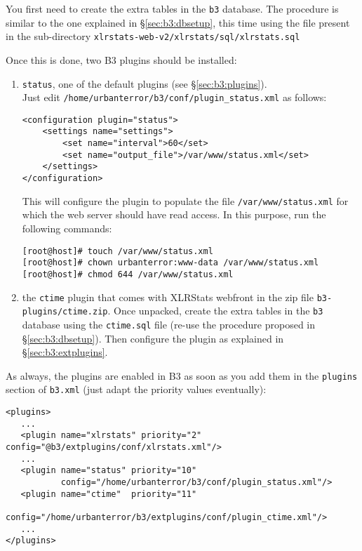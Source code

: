 \noindent 
You first need to create the extra tables in the \texttt{b3} database. 
The procedure is similar to the one explained in \S\ref{sec:b3:dbsetup}, this
time using the file present in the sub-directory 
\texttt{xlrstats-web-v2/xlrstats/sql/xlrstats.sql}

\noindent 
Once this is done, two B3 plugins should be installed: 
\begin{enumerate}
\item \texttt{status}, one of the default plugins (see \S\ref{sec:b3:plugins}). \\
  Just edit \texttt{/home/urbanterror/b3/conf/plugin\_status.xml} as follows:
  \begin{lstlisting}[style=apachecfg]    
<configuration plugin="status">
	<settings name="settings">
		<set name="interval">60</set>
		<set name="output_file">/var/www/status.xml</set>
	</settings>
</configuration>
  \end{lstlisting}
  This will configure the plugin to populate the file
  \texttt{/var/www/status.xml} for which the web server should have read
  access. In this purpose, run the following commands: 
  \begin{lstlisting}[style=command]
[root@host]# touch /var/www/status.xml
[root@host]# chown urbanterror:www-data /var/www/status.xml
[root@host]# chmod 644 /var/www/status.xml
  \end{lstlisting}
\item the \texttt{ctime} plugin that comes with XLRStats webfront in
  the zip file \texttt{b3-plugins/ctime.zip}. Once unpacked, 
  create the extra tables in the \texttt{b3} database using the
  \texttt{ctime.sql} file (re-use the procedure proposed in
  \S\ref{sec:b3:dbsetup}). 
  Then configure the plugin as explained in \S\ref{sec:b3:extplugins}.
\end{enumerate}

\noindent As always, the plugins are enabled in B3 as soon as you add them in the
\texttt{plugins} section of \texttt{b3.xml} (just adapt the priority values eventually): 
  \begin{lstlisting}[style=apachecfg]
<plugins>
   ...
   <plugin name="xlrstats" priority="2"  config="@b3/extplugins/conf/xlrstats.xml"/>
   ...
   <plugin name="status" priority="10"  
           config="/home/urbanterror/b3/conf/plugin_status.xml"/>
   <plugin name="ctime"  priority="11"
           config="/home/urbanterror/b3/extplugins/conf/plugin_ctime.xml"/>
   ...
</plugins>
  \end{lstlisting}

